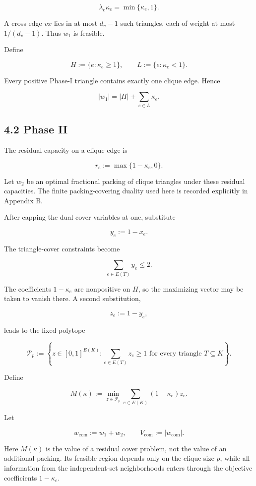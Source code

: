 \documentclass[
  11pt,
]{article}
\begin{document}
\[
\lambda_e\kappa_e
=
\min\{\kappa_e,1\}.
\tag{4.2}
\]

A cross edge \(vx\) lies in at most \(d_v-1\) such triangles, each of
weight at most \(1/(d_v-1)\). Thus \(w_1\) is feasible.

Define

\[
H:=\{e:\kappa_e\ge1\},
\qquad
L:=\{e:\kappa_e<1\}.
\]

Every positive Phase-I triangle contains exactly one clique edge. Hence

\[
|w_1|
=
|H|+\sum_{e\in L}\kappa_e.
\tag{4.3}
\]

\subsection{4.2 Phase II}\label{phase-ii}

The residual capacity on a clique edge is

\[
r_e:=\max\{1-\kappa_e,0\}.
\tag{4.4}
\]

Let \(w_2\) be an optimal fractional packing of clique triangles under
these residual capacities. The finite packing-covering duality used here
is recorded explicitly in Appendix B.

After capping the dual cover variables at one, substitute

\[
y_e:=1-x_e.
\]

The triangle-cover constraints become

\[
\sum_{e\in E(T)}y_e\le2.
\]

The coefficients \(1-\kappa_e\) are nonpositive on \(H\), so the
maximizing vector may be taken to vanish there. A second substitution,

\[
z_e:=1-y_e,
\]

leads to the fixed polytope

\[
\mathcal P_p
:=
\left\{
z\in[0,1]^{E(K)}:
\sum_{e\in E(T)}z_e\ge1
\text{ for every triangle }T\subseteq K
\right\}.
\tag{4.5}
\]

Define

\[
M(\kappa)
:=
\min_{z\in\mathcal P_p}
\sum_{e\in E(K)}(1-\kappa_e)z_e.
\tag{4.6}
\]

Let

\[
w_{\mathrm{com}}:=w_1+w_2,
\qquad
V_{\mathrm{com}}:=|w_{\mathrm{com}}|.
\]

Here \(M(\kappa)\) is the value of a residual cover problem, not the
value of an additional packing. Its feasible region depends only on the
clique size \(p\), while all information from the independent-set
neighborhoods enters through the objective coefficients \(1-\kappa_e\).
\end{document}
